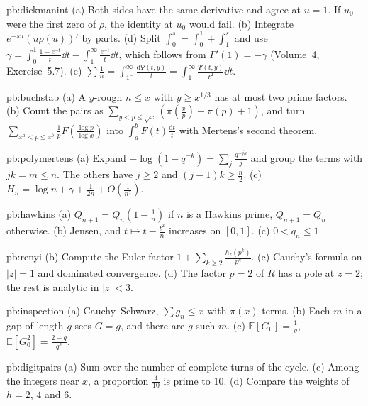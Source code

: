 \begin{hint}{pb:dickmanint}
(a) Both sides have the same derivative and agree at $u=1$. If $u_0$ were the first zero of $\rho$, the identity at $u_0$ would fail. (b) Integrate $e^{-su}(u\rho(u))'$ by parts.
(d) Split $\int_0^s=\int_0^1+\int_1^s$ and use $\gamma=\int_0^1\frac{1-e^{-t}}t\dd t-\int_1^\infty\frac{e^{-t}}t\dd t$, which follows from $\Gamma'(1)=-\gamma$ (Volume~4, Exercise~5.7).
(e) $\sum\frac1n=\int_{1^-}^\infty\frac{\mathrm d\Psi(t,y)}t=\int_1^\infty\frac{\Psi(t,y)}{t^2}\dd t$.
\end{hint}

\begin{hint}{pb:buchstab}
(a) A $y$-rough $n\le x$ with $y\ge x^{1/3}$ has at most two prime factors. (b) Count the pairs as $\sum_{y<p\le\sqrt x}(\pi(\frac xp)-\pi(p)+1)$, and turn
$\sum_{x^a<p\le x^b}\frac1pF(\frac{\log p}{\log x})$ into $\int_a^bF(t)\frac{\mathrm dt}t$ with Mertens's second theorem.
\end{hint}

\begin{hint}{pb:polymertens}
(a) Expand $-\log(1-q^{-k})=\sum_j\frac{q^{-jk}}j$ and group the terms with $jk=m\le n$. The others have $j\ge2$ and $(j-1)k\ge\frac n2$. (c) $H_n=\log n+\gamma+\frac1{2n}+O(\frac1{n^2})$.
\end{hint}

\begin{hint}{pb:hawkins}
(a) $Q_{n+1}=Q_n(1-\frac1n)$ if $n$ is a Hawkins prime, $Q_{n+1}=Q_n$ otherwise. (b) Jensen, and $t\mapsto t-\frac{t^2}n$ increases on $[0,1]$. (c) $0<q_n\le1$.
\end{hint}

\begin{hint}{pb:renyi}
(b) Compute the Euler factor $1+\sum_{k\ge2}\frac{h_z(p^k)}{p^k}$. (c) Cauchy's formula on $|z|=1$ and dominated convergence. (d) The factor $p=2$ of $R$ has a pole at $z=2$; the rest
is analytic in $|z|<3$.
\end{hint}

\begin{hint}{pb:inspection}
(a) Cauchy--Schwarz, $\sum g_n\le x$ with $\pi(x)$ terms. (b) Each $m$ in a gap of length $g$ sees $G=g$, and there are $g$ such $m$. (c) $\mathbb E[G_0]=\frac1q$, $\mathbb E[G_0^2]=\frac{2-q}{q^2}$.
\end{hint}

\begin{hint}{pb:digitpairs}
(a) Sum over the number of complete turns of the cycle. (c) Among the integers near $x$, a proportion $\frac4{10}$ is prime to $10$. (d) Compare the weights of $h=2$, $4$ and $6$.
\end{hint}

